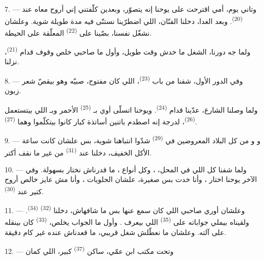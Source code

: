 7. --- وتاني يوم، أمي اقترحت على يوحنا إنه يتصوّر، وبعدين كلّفتني إني أروح معاه
عند  \textsuperscript{(20)}. وبعد الغدا، دخلنا 
الفنّان، اللي اضطرّينا نستنّى فيه مدة طويلة شوية. وعلشان نشغّل نفسنا، بصّينا على
 \textsuperscript{(22)} المعلّقة على الحيطة.

ولما جه دورنا، الشغل ما خدش وقت طويل، وأول ما صاحبي خلص وقوف قدام
 \textsuperscript{(21)}، نزلنا.

8. --- وفي الدور الأول، شفنا من باب  \textsuperscript{(23)}، اللي كان
مفتوح، صبيّه وهو بيقصّ شعر زبون.

ولما وصلنا الشارع، عدّينا قدام  \textsuperscript{(24)}. ويوحنا
اتسلّى أوي بـ \textsuperscript{(25)} الأحمر وبـ
اللي بيتستعمل  \textsuperscript{(26)}، لدرجة إنه اصطدم باتنين أساتذة
كبار كانوا بيتكلّموا وهما  \textsuperscript{(27)}.

\VUsaut{3.0mm}

9. --- و و من كل البلاد المعروضين في
  \textsuperscript{(29)} شدّوا انتباهنا شوية، بس علشان
كانت ساعة الأكل الخفيف، دخلنا عند  \textsuperscript{(31)} من غير ما
نقف أكتر.

10. --- ولما شفنا كل  اللي في المحل، ، وكل أنواع ، ما قدرناش نختار بسهولة. وفي الآخر
يوحنا اختار ، وأنا خدت بس  صغيرة، علشان الحلويات
، وأنا مش عايز خالص أروح كتير عند 
\textsuperscript{(30)}.

\VUsaut{3.0mm}

11. --- وعلشان أوري صاحبي  اللي كان سمع عنها بس ما شافهاش،
دخلنا  \textsuperscript{(32)}  \textsuperscript{(34)}.
ولقيناه بيملي جواباته على  \textsuperscript{(35)} اللي بيعرف
. وأول ما الجواب يخلص، 
\textsuperscript{(33)} كان بينقله على آلته. وعلشان ما نعطّلش شغل قريبي، ما قعدناش
عنده غير كام دقيقة.

12. --- وتحت مكتب ابن عمّي، ساكن  \textsuperscript{(37)}
كبير، اللي كمان

